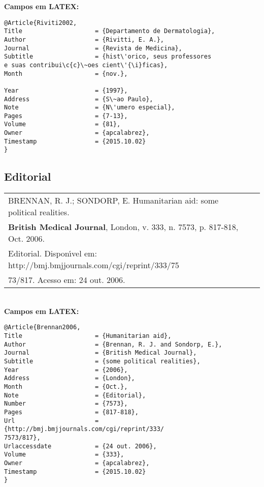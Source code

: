\textbf{Campos em LATEX:} 

\begin{verbatim}
@Article{Riviti2002,
Title                    = {Departamento de Dermatologia},
Author                   = {Rivitti, E. A.},
Journal                  = {Revista de Medicina},
Subtitle                 = {hist\'orico, seus professores
e suas contribui\c{c}\~oes cient\'{\i}ficas},
Month                    = {nov.},

Year                     = {1997},
Address                  = {S\~ao Paulo},
Note                     = {N\'umero especial},
Pages                    = {7-13},
Volume                   = {81},
Owner                    = {apcalabrez},
Timestamp                = {2015.10.02}
}
\end{verbatim}

\subsection{Editorial} 

\begin{tabular}{|l|c|} \hline
	BRENNAN, R. J.; SONDORP, E. Humanitarian aid: some political realities. \\ \textbf{British Medical Journal}, London, v. 333, n. 7573, p. 817-818, Oct. 2006. \\Editorial. Dispon\'{\i}vel em: http://bmj.bmjjournals.com/cgi/reprint/333/75\\73/817. Acesso em: 24 out. 2006. \\\hline
\end{tabular} \\

\textbf{Campos em LATEX:} 

\begin{verbatim}
@Article{Brennan2006,
Title                    = {Humanitarian aid},
Author                   = {Brennan, R. J. and Sondorp, E.},
Journal                  = {British Medical Journal},
Subtitle                 = {some political realities},
Year                     = {2006},
Address                  = {London},
Month                    = {Oct.},
Note                     = {Editorial},
Number                   = {7573},
Pages                    = {817-818},
Url                      = {http://bmj.bmjjournals.com/cgi/reprint/333/
7573/817},
Urlaccessdate            = {24 out. 2006},
Volume                   = {333},
Owner                    = {apcalabrez},
Timestamp                = {2015.10.02}
}
\end{verbatim}


